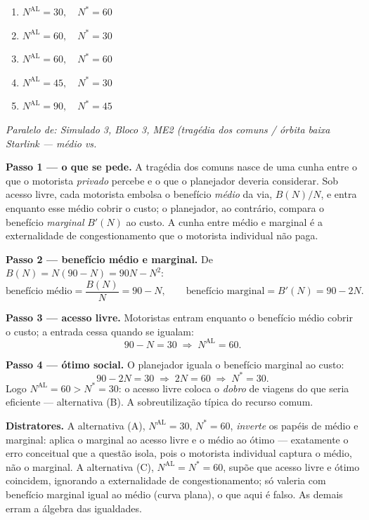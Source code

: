 \begin{enumerate}[label=\Alph*., leftmargin=3.2em, itemsep=0.15em, topsep=0.2em]
  \item $N^{\text{AL}}=30,\quad N^{*}=60$
  \item $N^{\text{AL}}=60,\quad N^{*}=30$
  \item $N^{\text{AL}}=60,\quad N^{*}=60$
  \item $N^{\text{AL}}=45,\quad N^{*}=30$
  \item $N^{\text{AL}}=90,\quad N^{*}=45$
\end{enumerate}
\begin{solucao}
{\footnotesize\textit{Paralelo de: Simulado 3, Bloco 3, ME2 (tragédia dos comuns / órbita baixa Starlink — médio vs.}}\par\vspace{0.2em}
\textbf{Passo 1 --- o que se pede.} A trag\'edia dos comuns nasce de uma cunha entre o que o motorista \emph{privado} percebe e o que o planejador deveria considerar. Sob acesso livre, cada motorista embolsa o benef\'icio \emph{m\'edio} da via, $B(N)/N$, e entra enquanto esse m\'edio cobrir o custo; o planejador, ao contr\'ario, compara o benef\'icio \emph{marginal} $B'(N)$ ao custo. A cunha entre m\'edio e marginal \'e a externalidade de congestionamento que o motorista individual n\~ao paga.

\textbf{Passo 2 --- benef\'icio m\'edio e marginal.} De $B(N)=N(90-N)=90N-N^{2}$:
\[
\text{benef\'icio m\'edio}=\frac{B(N)}{N}=90-N,\qquad \text{benef\'icio marginal}=B'(N)=90-2N.
\]

\textbf{Passo 3 --- acesso livre.} Motoristas entram enquanto o benef\'icio m\'edio cobrir o custo; a entrada cessa quando se igualam:
\[
90-N=30\;\Longrightarrow\; N^{\text{AL}}=60.
\]

\textbf{Passo 4 --- \'otimo social.} O planejador iguala o benef\'icio marginal ao custo:
\[
90-2N=30\;\Longrightarrow\;2N=60\;\Longrightarrow\; N^{*}=30.
\]
Logo $N^{\text{AL}}=60>N^{*}=30$: o acesso livre coloca o \emph{dobro} de viagens do que seria eficiente --- alternativa (B). A sobreutiliza\c{c}\~ao t\'ipica do recurso comum.

\textbf{Distratores.} A alternativa (A), $N^{\text{AL}}=30,\,N^{*}=60$, \emph{inverte} os pap\'eis de m\'edio e marginal: aplica o marginal ao acesso livre e o m\'edio ao \'otimo --- exatamente o erro conceitual que a quest\~ao isola, pois o motorista individual captura o m\'edio, n\~ao o marginal. A alternativa (C), $N^{\text{AL}}=N^{*}=60$, sup\~oe que acesso livre e \'otimo coincidem, ignorando a externalidade de congestionamento; s\'o valeria com benef\'icio marginal igual ao m\'edio (curva plana), o que aqui \'e falso. As demais erram a \'algebra das igualdades.


\end{solucao}
